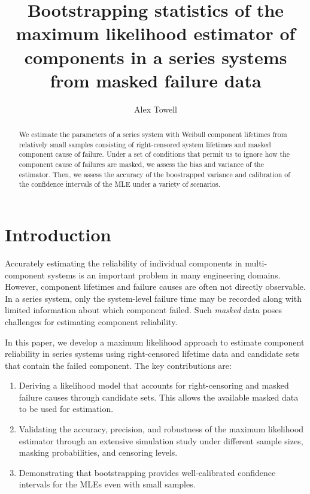 \documentclass[
]{article}
\title{Bootstrapping statistics of the maximum likelihood estimator of
components in a series systems from masked failure data}
\author{Alex Towell}
\date{}
\begin{document}
\maketitle
\begin{abstract}
We estimate the parameters of a series system with Weibull component
lifetimes from relatively small samples consisting of right-censored
system lifetimes and masked component cause of failure. Under a set of
conditions that permit us to ignore how the component cause of failures
are masked, we assess the bias and variance of the estimator. Then, we
assess the accuracy of the boostrapped variance and calibration of the
confidence intervals of the MLE under a variety of scenarios.
\end{abstract}

{
\setcounter{tocdepth}{2}
\tableofcontents
}
\newcommand{\T}{T}
\newtheorem{definition}{Definition}
\newtheorem{theorem}{Theorem}
\newtheorem{corollary}{Corollary}
\newtheorem{condition}{Condition}
\renewcommand{\v}[1]{\boldsymbol{#1}}

\hypertarget{introduction}{%
\section{Introduction}\label{introduction}}

Accurately estimating the reliability of individual components in
multi-component systems is an important problem in many engineering
domains. However, component lifetimes and failure causes are often not
directly observable. In a series system, only the system-level failure
time may be recorded along with limited information about which
component failed. Such \emph{masked} data poses challenges for
estimating component reliability.

In this paper, we develop a maximum likelihood approach to estimate
component reliability in series systems using right-censored lifetime
data and candidate sets that contain the failed component. The key
contributions are:

\begin{enumerate}
\def\labelenumi{\arabic{enumi}.}
\item
  Deriving a likelihood model that accounts for right-censoring and
  masked failure causes through candidate sets. This allows the
  available masked data to be used for estimation.
\item
  Validating the accuracy, precision, and robustness of the maximum
  likelihood estimator through an extensive simulation study under
  different sample sizes, masking probabilities, and censoring levels.
\item
  Demonstrating that bootstrapping provides well-calibrated confidence
  intervals for the MLEs even with small samples.
\end{enumerate}
\end{document}
